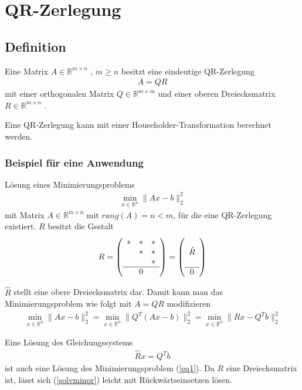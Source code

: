 \chapter{QR-Zerlegung}

\section{Definition}
Eine Matrix $A \in \mathbb{R}^{m \times n}$ , $m \ge n$ besitzt eine eindeutige QR-Zerlegung
\begin{align}
A = QR
\end{align}
mit einer orthogonalen Matrix $ Q \in \mathbb{R}^{m \times m} $ und einer oberen Dreiecksmatrix $ R \in \mathbb{R}^{m \times n}$ \cite{num1}.

Eine QR-Zerlegung kann mit einer Householder-Transformation berechnet werden.

\subsection{Beispiel für eine Anwendung}
Lösung eines Minimierungsproblems
\begin{align}
\min_{x \in \mathbb{R}^n} \|Ax-b\|_2^2 \label{eq1}
\end{align}
mit Matrix $A \in \mathbb{R}^{m\times n}$ mit $rang(A) = n < m$, für die eine QR-Zerlegung existiert.
$R$ besitzt die Gestalt 
\begin{align*}
R=	
\left(\begin{array}{ccc}
*&*&* \\ 
&*&* \\ 
& &* \\ \hline
& 0 &
\end{array} \right)
=
\left(\begin{array}{c}
\\ 
\hat{R} \\ 
\\ \hline
0
\end{array} \right) 
\end{align*}

$\hat{R}$ stellt eine obere Dreiecksmatrix dar.
Damit kann man das Minimierungsproblem wie folgt mit $A=QR$ modifizieren
\begin{align}
\min_{x \in \mathbb{R}^n} \|Ax-b\|_2^2 =
\min_{x \in \mathbb{R}^n} \|Q^T(Ax-b)\|_2^2 =
\min_{x \in \mathbb{R}^n} \|Rx-Q^Tb\|_2^2
\end{align}

Eine Lösung des Gleichungssystems
\begin{align}
\hat{R}x=Q^Tb \label{solvminqr}
\end{align}
ist auch eine Lösung des Minimierungsproblem (\ref{eq1}). Da $R$ eine Dreiecksmatrix ist, lässt sich (\ref{solvminqr}) leicht mit Rückwärtseinsetzen  lösen.


